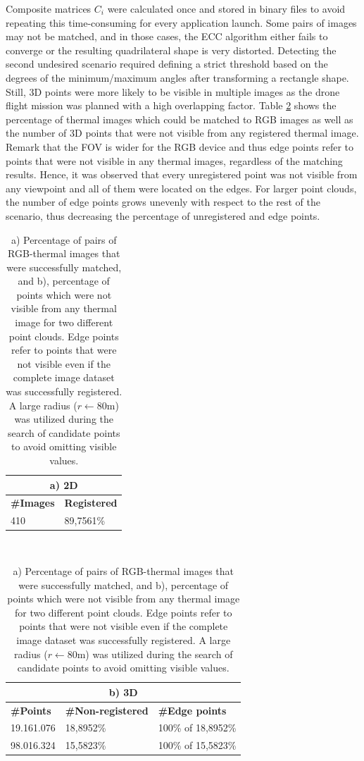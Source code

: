 Composite matrices $C_i$ were calculated once and stored in binary files to avoid repeating this time-consuming for every application launch. Some pairs of images may not be matched, and in those cases, the ECC algorithm either fails to converge or the resulting quadrilateral shape is very distorted. Detecting the second undesired scenario required defining a strict threshold based on the degrees of the minimum/maximum angles after transforming a rectangle shape. Still, 3D points were more likely to be visible in multiple images as the drone flight mission was planned with a high overlapping factor. Table \ref{table:image_registration_statistics} shows the percentage of thermal images which could be matched to RGB images as well as the number of 3D points that were not visible from any registered thermal image. Remark that the FOV is wider for the RGB device and thus edge points refer to points that were not visible in any thermal images, regardless of the matching results. Hence, it was observed that every unregistered point was not visible from any viewpoint and all of them were located on the edges. For larger point clouds, the number of edge points grows unevenly with respect to the rest of the scenario, thus decreasing the percentage of unregistered and edge points.

\begin{table}
    \caption{a) Percentage of pairs of RGB-thermal images that were successfully matched, and b), percentage of points which were not visible from any thermal image for two different point clouds. Edge points refer to points that were not visible even if the complete image dataset was successfully registered. A large radius ($r \gets 80$\si{\meter}) was utilized during the search of candidate points to avoid omitting visible values.}
    \label{table:image_registration_statistics}
    \begin{tabular}{l@{\hskip 0.5in}l@{}}
        \multicolumn{2}{c}{a) 2D}\\
        \midrule
        \textbf{\#Images} & \textbf{Registered}\\
        \midrule
        410 & 89,7561\% \\
        \bottomrule
    \end{tabular}\\[2mm]
    \begin{tabular}{l@{\hskip 0.5in}l@{\hskip 0.5in}l@{}}
        \multicolumn{3}{c}{b) 3D}\\
        \midrule
        \textbf{\#Points} & \textbf{\#Non-registered} & \textbf{\#Edge points}\\
        \midrule
        19.161.076 & 18,8952\% & 100\% of 18,8952\%\\
        98.016.324 & 15,5823\% & 100\% of 15,5823\%\\
        \bottomrule
    \end{tabular}
\end{table}

